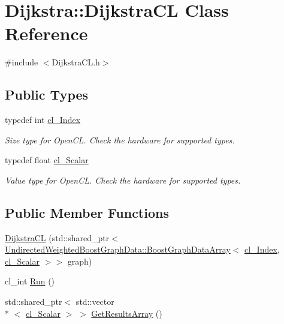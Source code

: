 \hypertarget{class_dijkstra_1_1_dijkstra_c_l}{\section{Dijkstra\+:\+:Dijkstra\+C\+L Class Reference}
\label{class_dijkstra_1_1_dijkstra_c_l}
}


{\ttfamily \#include $<$Dijkstra\+C\+L.\+h$>$}

\subsection*{Public Types}
\begin{DoxyCompactItemize}
\item 
typedef int \hyperlink{class_dijkstra_1_1_dijkstra_c_l_aab92585b062690f0835f154dc28f8c04}{cl\+\_\+\+Index}
\begin{DoxyCompactList}\small\item\em Size type for Open\+C\+L. Check the hardware for supported types. \end{DoxyCompactList}\item 
typedef float \hyperlink{class_dijkstra_1_1_dijkstra_c_l_a5dc96724577a49ee14d4c2e1df3c0579}{cl\+\_\+\+Scalar}
\begin{DoxyCompactList}\small\item\em Value type for Open\+C\+L. Check the hardware for supported types. \end{DoxyCompactList}\end{DoxyCompactItemize}
\subsection*{Public Member Functions}
\begin{DoxyCompactItemize}
\item 
\hyperlink{class_dijkstra_1_1_dijkstra_c_l_a568bd4b94630d1add7a753b827b518e1}{Dijkstra\+C\+L} (std\+::shared\+\_\+ptr$<$ \hyperlink{struct_undirected_weighted_graph_1_1_graph_array}{Undirected\+Weighted\+BoostGraphData\+::\+BoostGraphData\+Array}$<$ \hyperlink{class_dijkstra_1_1_dijkstra_c_l_aab92585b062690f0835f154dc28f8c04}{cl\+\_\+\+Index}, \hyperlink{class_dijkstra_1_1_dijkstra_c_l_a5dc96724577a49ee14d4c2e1df3c0579}{cl\+\_\+\+Scalar} $>$$>$ graph)
\item 
cl\+\_\+int \hyperlink{class_dijkstra_1_1_dijkstra_c_l_adaceb81f91f37f7533c8e64446a4845b}{Run} ()
\item 
std\+::shared\+\_\+ptr$<$ std\+::vector\\*
$<$ \hyperlink{class_dijkstra_1_1_dijkstra_c_l_a5dc96724577a49ee14d4c2e1df3c0579}{cl\+\_\+\+Scalar} $>$ $>$ \hyperlink{class_dijkstra_1_1_dijkstra_c_l_aafeab7cb87014b004bf788387290eaa6}{Get\+Results\+Array} ()
\end{DoxyCompactItemize}
